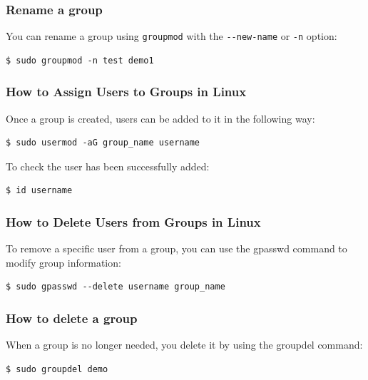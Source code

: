 \documentclass{article}
\newenvironment{codetemplate}[1][]{%
  \mybasecolorbox[#1]
  \itshape
}{%
  \endmybasecolorbox
}
\begin{document}
\subsubsection{Rename a group}
You can rename a group using \verb|groupmod| with the \verb|--new-name| or \verb|-n| option:
\begin{codetemplate}{}
\begin{verbatim}
$ sudo groupmod -n test demo1
\end{verbatim}
\end{codetemplate}

\subsubsection{How to Assign Users to Groups in Linux}

Once a group is created, users can be added to it in the following way:
\begin{codetemplate}{}
\begin{verbatim}
$ sudo usermod -aG group_name username
\end{verbatim}
\end{codetemplate}

To check the user has been successfully added:
\begin{codetemplate}{}
\begin{verbatim}
$ id username
\end{verbatim}
\end{codetemplate}

\subsubsection{How to Delete Users from Groups in Linux}
To remove a specific user from a group, you can use the gpasswd command to modify group information:
\begin{codetemplate}{}
\begin{verbatim}
$ sudo gpasswd --delete username group_name
\end{verbatim}
\end{codetemplate}

\subsubsection{How to delete a group}
When a group is no longer needed, you delete it by using the groupdel command:

\begin{codetemplate}{}
\begin{verbatim}
$ sudo groupdel demo
\end{verbatim}
\end{codetemplate}
\end{document}

